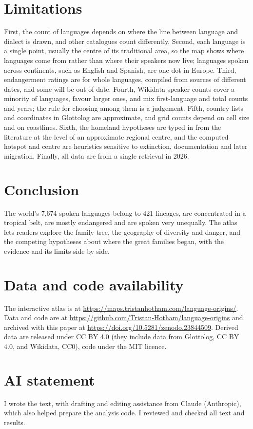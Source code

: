 \documentclass[11pt,a4paper]{article}
\begin{document}
\section{Limitations}
First, the count of languages depends on where the line between language and dialect is drawn, and other catalogues count differently. Second, each language is a single point, usually the centre of its traditional area, so the map shows where languages come from rather than where their speakers now live; languages spoken across continents, such as English and Spanish, are one dot in Europe. Third, endangerment ratings are for whole languages, compiled from sources of different dates, and some will be out of date. Fourth, Wikidata speaker counts cover a minority of languages, favour larger ones, and mix first-language and total counts and years; the rule for choosing among them is a judgement. Fifth, country lists and coordinates in Glottolog are approximate, and grid counts depend on cell size and on coastlines. Sixth, the homeland hypotheses are typed in from the literature at the level of an approximate regional centre, and the computed hotspot and centre are heuristics sensitive to extinction, documentation and later migration. Finally, all data are from a single retrieval in 2026.

\section{Conclusion}
The world's 7,674 spoken languages belong to 421 lineages, are concentrated in a tropical belt, are mostly endangered and are spoken very unequally. The atlas lets readers explore the family tree, the geography of diversity and danger, and the competing hypotheses about where the great families began, with the evidence and its limits side by side.

\section*{Data and code availability}
The interactive atlas is at \url{https://maps.tristanhotham.com/language-origins/}. Data and code are at \url{https://github.com/Tristan-Hotham/language-origins} and archived with this paper at \url{https://doi.org/10.5281/zenodo.23844509}. Derived data are released under CC BY 4.0 (they include data from Glottolog, CC BY 4.0, and Wikidata, CC0), code under the MIT licence.

\section*{AI statement}
I wrote the text, with drafting and editing assistance from Claude (Anthropic), which also helped prepare the analysis code. I reviewed and checked all text and results.
\end{document}
